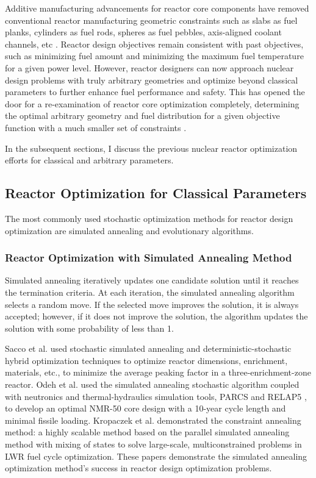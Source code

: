 Additive manufacturing advancements for reactor core components have
removed conventional reactor manufacturing geometric constraints such as slabs as fuel 
planks, cylinders as fuel rods, spheres as fuel pebbles, axis-aligned coolant 
channels, etc  \cite{sobes_artificial_2020}.
Reactor design objectives remain consistent with past objectives, such as 
minimizing fuel amount and minimizing the maximum fuel temperature for a given 
power level.
However, reactor designers can now approach nuclear design problems with truly 
arbitrary geometries and optimize beyond classical parameters to further enhance 
fuel performance and safety.
This has opened the door for a re-examination of reactor core 
optimization completely, determining the optimal arbitrary geometry 
and fuel distribution for a given objective function with a much smaller set of 
constraints \cite{sobes_artificial_2020}. 

In the subsequent sections, I discuss the previous nuclear reactor optimization 
efforts for classical and arbitrary parameters.

\subsection{Reactor Optimization for Classical Parameters}
The most commonly used stochastic optimization methods for reactor design 
optimization are simulated annealing and evolutionary algorithms. 

\subsubsection{Reactor Optimization with Simulated Annealing Method}
Simulated annealing iteratively updates one candidate solution until it reaches 
the termination criteria. 
At each iteration, the simulated annealing algorithm selects a random move. 
If the selected move improves the solution, it is always accepted; however,  
if it does not improve the solution, the algorithm updates the solution with 
some probability of less than 1.

Sacco et al. \cite{sacco_two_2006,sacco_metropolis_2008} used stochastic 
simulated annealing and deterministic-stochastic hybrid optimization techniques 
to optimize reactor dimensions, enrichment, materials, etc., to 
minimize the average peaking factor in a three-enrichment-zone reactor. 
Odeh et al. \cite{odeh_core_2016} used the simulated annealing stochastic algorithm 
coupled with neutronics and thermal-hydraulics simulation tools, \gls{PARCS} and RELAP5
\cite{fletcher_relap5mod3_1992}, to develop an optimal \gls{NMR-50} core design 
with a 10-year cycle length and minimal fissile loading. 
Kropaczek et al. \cite{kropaczek_large-scale_2019} demonstrated the constraint 
annealing method: a highly scalable method based on the parallel simulated annealing 
method with mixing of states \cite{kropaczek_constraint_2019} to solve large-scale, 
multiconstrained problems in \gls{LWR} fuel cycle optimization. 
These papers demonstrate the simulated annealing optimization method's success in 
reactor design optimization problems. 

